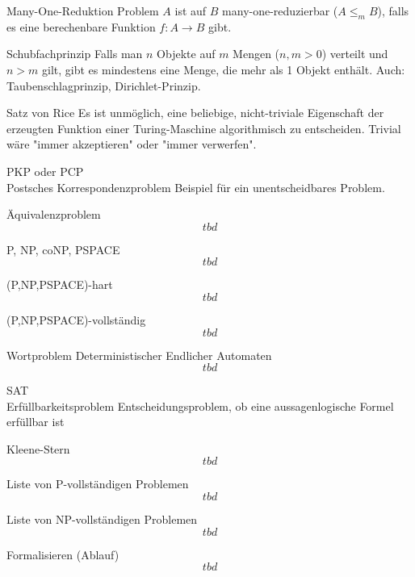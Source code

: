 \documentclass[a7paper,print,grid=both]{kartei}
\begin{document}
\begin{karte}{Many-One-Reduktion}
Problem $A$ ist auf $B$ many-one-reduzierbar ($A \leq_m B$), falls es eine berechenbare Funktion $f:A\rightarrow B$ gibt.
\end{karte}
\begin{karte}{Schubfachprinzip}
Falls man $n$ Objekte auf $m$ Mengen ($n,m>0$) verteilt und $n>m$ gilt, gibt es mindestens eine Menge, die mehr als 1 Objekt enthält. Auch: Taubenschlagprinzip, Dirichlet-Prinzip.
\end{karte}
\begin{karte}{Satz von Rice}
Es ist unmöglich, eine beliebige, nicht-triviale Eigenschaft der erzeugten Funktion einer Turing-Maschine algorithmisch zu entscheiden. Trivial wäre "immer akzeptieren" oder "immer verwerfen".
\end{karte}
\begin{karte}{PKP oder PCP\\Postsches Korrespondenzproblem}
Beispiel für ein unentscheidbares Problem.
\end{karte}
\begin{karte}{Äquivalenzproblem}
\[tbd\]
\end{karte}
\begin{karte}{P, NP, coNP, PSPACE}
\[tbd\]
\end{karte}
\begin{karte}{(P,NP,PSPACE)-hart}
\[tbd\]
\end{karte}
\begin{karte}{(P,NP,PSPACE)-vollständig}
\[tbd\]
\end{karte}
\begin{karte}{Wortproblem Deterministischer Endlicher Automaten}
\[tbd\]
\end{karte}
\begin{karte}{SAT\\Erfüllbarkeitsproblem}
Entscheidungsproblem, ob eine aussagenlogische Formel erfüllbar ist
\end{karte}
\begin{karte}{Kleene-Stern}
\[tbd\]
\end{karte}
\begin{karte}{Liste von P-vollständigen Problemen}
\[tbd\]
\end{karte}
\begin{karte}{Liste von NP-vollständigen Problemen}
\[tbd\]
\end{karte}
\begin{karte}{Formalisieren (Ablauf)}
\[tbd\]
\end{karte}
\end{document}
